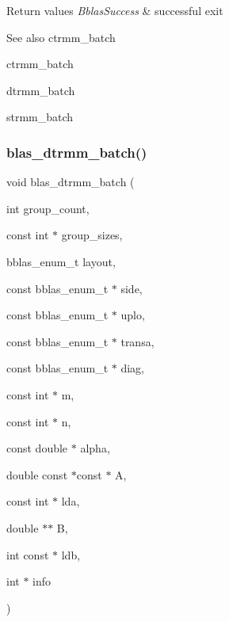 \begin{DoxyRetVals}{Return values}
{\em Bblas\+Success} & successful exit\\
\hline
\end{DoxyRetVals}
\begin{DoxySeeAlso}{See also}
ctrmm\+\_\+batch 

ctrmm\+\_\+batch 

dtrmm\+\_\+batch 

strmm\+\_\+batch 
\end{DoxySeeAlso}
\mbox{\label{group__trmm__batch_ga8b6216cfe24af976ee344f94dacd6e9d}} 
\subsubsection{\texorpdfstring{blas\+\_\+dtrmm\+\_\+batch()}{blas\_dtrmm\_batch()}}
{\footnotesize\ttfamily void blas\+\_\+dtrmm\+\_\+batch (\begin{DoxyParamCaption}\item[{int}]{group\+\_\+count,  }\item[{const int $\ast$}]{group\+\_\+sizes,  }\item[{bblas\+\_\+enum\+\_\+t}]{layout,  }\item[{const bblas\+\_\+enum\+\_\+t $\ast$}]{side,  }\item[{const bblas\+\_\+enum\+\_\+t $\ast$}]{uplo,  }\item[{const bblas\+\_\+enum\+\_\+t $\ast$}]{transa,  }\item[{const bblas\+\_\+enum\+\_\+t $\ast$}]{diag,  }\item[{const int $\ast$}]{m,  }\item[{const int $\ast$}]{n,  }\item[{const double $\ast$}]{alpha,  }\item[{double const $\ast$const $\ast$}]{A,  }\item[{const int $\ast$}]{lda,  }\item[{double $\ast$$\ast$}]{B,  }\item[{int const $\ast$}]{ldb,  }\item[{int $\ast$}]{info }\end{DoxyParamCaption})}

